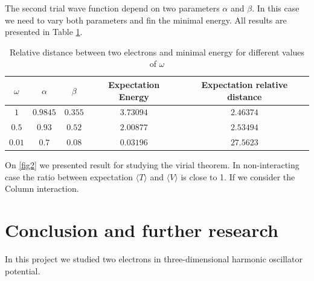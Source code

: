 \documentclass[10pt]{article}
\begin{document}
The second trial wave function depend on two parameters $\alpha$ and $\beta$. In this case we need to vary both parameters and fin the minimal energy. All results are presented in Table \ref{tab:two}.
 
\begin{table}[h!]
  \caption{Relative distance between two electrons and minimal energy for different values of $\omega$}
  \label{tab:two}
  \begin{center}
    \begin{tabular}{c|c|c|c|c}
    \hline
		$\omega$ & $\alpha$& $\beta$ & Expectation Energy & Expectation relative distance \\
    \hline
	$	1 $  & $0.9845$& $0.355$ & $3.73094$ & $2.46374$  \\
	$	0.5$  & $0.93$ & $0.52$ & $2.00877$ & $2.53494$   \\
	$	0.01$  & $0.7$ & $0.08$ & $0.03196$ & $27.5623$   \\
	\end{tabular}
  \end{center}
\end{table}


On \ref{fig2} we presented result for studying the virial theorem. In non-interacting case the ratio between expectation  $\langle T \rangle$  and   $\langle V \rangle$ is close to 1. If we consider the Column interaction.

\newpage
\clearpage
\section{Conclusion and further research}\label{conc}
In this project we studied two electrons in three-dimensional harmonic oscillator potential. 
\clearpage
\newpage
\end{document}
